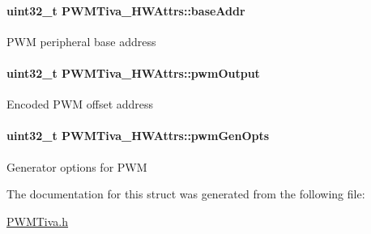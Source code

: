 \paragraph[{base\+Addr}]{\setlength{\rightskip}{0pt plus 5cm}uint32\+\_\+t P\+W\+M\+Tiva\+\_\+\+H\+W\+Attrs\+::base\+Addr}\label{struct_p_w_m_tiva___h_w_attrs_a12270fd5eca318763aab674472954692}
P\+W\+M peripheral base address 
\paragraph[{pwm\+Output}]{\setlength{\rightskip}{0pt plus 5cm}uint32\+\_\+t P\+W\+M\+Tiva\+\_\+\+H\+W\+Attrs\+::pwm\+Output}\label{struct_p_w_m_tiva___h_w_attrs_a125b0d4868fff9b2e30624fbbdc67df9}
Encoded P\+W\+M offset address 
\paragraph[{pwm\+Gen\+Opts}]{\setlength{\rightskip}{0pt plus 5cm}uint32\+\_\+t P\+W\+M\+Tiva\+\_\+\+H\+W\+Attrs\+::pwm\+Gen\+Opts}\label{struct_p_w_m_tiva___h_w_attrs_a000c25643c0e7aff1422a6a7b812193f}
Generator options for P\+W\+M 

The documentation for this struct was generated from the following file\+:\begin{DoxyCompactItemize}
\item 
\hyperlink{_p_w_m_tiva_8h}{P\+W\+M\+Tiva.\+h}\end{DoxyCompactItemize}
